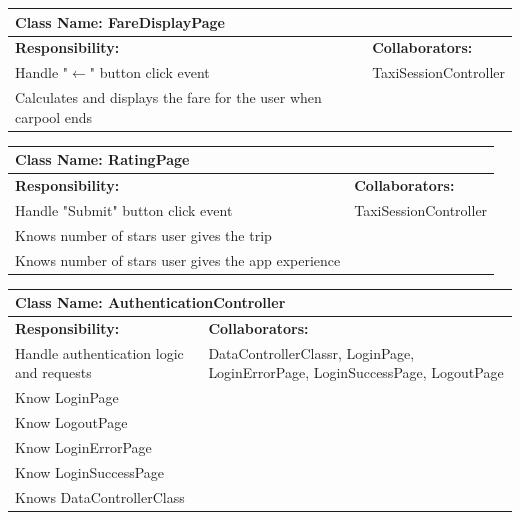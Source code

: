 \documentclass[]{article}
\begin{document}
	\begin{table}[H]
	\centering
	\begin{tabular}{|p{6cm}|p{6cm}|}
	\hline 
		\multicolumn{2}{|l|}{\textbf{Class Name: FareDisplayPage}} \\
	\hline
	\textbf{Responsibility:} & \textbf{Collaborators:} \\
	\hline
	Handle "$\xleftarrow{}$" button click event  & TaxiSessionController \\ \hline
	Calculates and displays the fare for the user when carpool ends & \\ \hline
	\end{tabular}
	\end{table}
	
	\begin{table}[H]
	\centering
	\begin{tabular}{|p{6cm}|p{6cm}|}
	\hline 
		\multicolumn{2}{|l|}{\textbf{Class Name: RatingPage}} \\
	\hline
	\textbf{Responsibility:} & \textbf{Collaborators:} \\
	\hline
	Handle "Submit" button click event  & TaxiSessionController \\ \hline
	Knows number of stars user gives the trip & \\ \hline
	Knows number of stars user gives the app experience & \\ \hline
	\end{tabular}
	\end{table}
	
	\begin{table}[H]
	\centering
	\begin{tabular}{|p{6cm}|p{6cm}|}
	\hline 
		\multicolumn{2}{|l|}{\textbf{Class Name: AuthenticationController}} \\
	\hline
	\textbf{Responsibility:} & \textbf{Collaborators:} \\
	\hline
	Handle authentication logic and requests & DataControllerClassr, LoginPage, LoginErrorPage, LoginSuccessPage, LogoutPage\\ \hline 
	Know LoginPage & \\ \hline 
	Know LogoutPage & \\ \hline 
	Know LoginErrorPage & \\ \hline
	Know LoginSuccessPage & \\ \hline
	Knows DataControllerClass& \\ \hline
	\end{tabular}
	\end{table}
\end{document}
